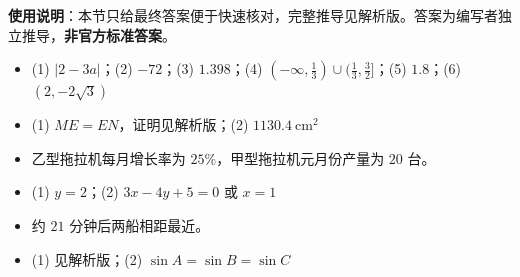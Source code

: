 
\begin{gknotice}
\textbf{使用说明}：本节只给最终答案便于快速核对，完整推导见解析版。答案为编写者独立推导，\textbf{非官方标准答案}。
\end{gknotice}

\begin{itemize}[leftmargin=2.6em]
  \item[\textbf{1.}] (1) $\lvert2-3a\rvert$；(2) $-72$；(3) $1.398$；(4) $(-\infty,\frac13)\cup(\frac13,\frac32]$；(5) $1.8$；(6) $(2,-2\sqrt3)$
  \item[\textbf{2.}] (1) $ME=EN$，证明见解析版；(2) $1130.4\ \mathrm{cm^2}$
  \item[\textbf{3.}] 乙型拖拉机每月增长率为 $25\%$，甲型拖拉机元月份产量为 $20$ 台。
  \item[\textbf{4.}] (1) $y=2$；(2) $3x-4y+5=0$ 或 $x=1$
  \item[\textbf{5.}] 约 $21$ 分钟后两船相距最近。
  \item[\textbf{6.}] (1) 见解析版；(2) $\sin A=\sin B=\sin C$
\end{itemize}
